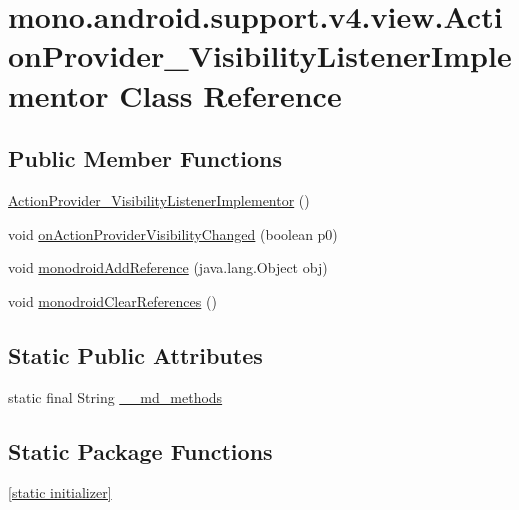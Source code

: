 \hypertarget{classmono_1_1android_1_1support_1_1v4_1_1view_1_1_action_provider___visibility_listener_implementor}{
\section{mono.android.support.v4.view.ActionProvider\_\-VisibilityListenerImplementor Class Reference}
\label{classmono_1_1android_1_1support_1_1v4_1_1view_1_1_action_provider___visibility_listener_implementor}
}
\subsection*{Public Member Functions}
\begin{CompactItemize}
\item 
\hyperlink{classmono_1_1android_1_1support_1_1v4_1_1view_1_1_action_provider___visibility_listener_implementor_54c95cb9758679e3b2254d2e794225ec}{ActionProvider\_\-VisibilityListenerImplementor} ()
\item 
void \hyperlink{classmono_1_1android_1_1support_1_1v4_1_1view_1_1_action_provider___visibility_listener_implementor_242f9c61e064dd7019178ff6eb12b360}{onActionProviderVisibilityChanged} (boolean p0)
\item 
void \hyperlink{classmono_1_1android_1_1support_1_1v4_1_1view_1_1_action_provider___visibility_listener_implementor_a32d9154545fa29cbb80371b3c21e709}{monodroidAddReference} (java.lang.Object obj)
\item 
void \hyperlink{classmono_1_1android_1_1support_1_1v4_1_1view_1_1_action_provider___visibility_listener_implementor_b013ec17b3d4bb666c53f6acfc93b9c4}{monodroidClearReferences} ()
\end{CompactItemize}
\subsection*{Static Public Attributes}
\begin{CompactItemize}
\item 
static final String \hyperlink{classmono_1_1android_1_1support_1_1v4_1_1view_1_1_action_provider___visibility_listener_implementor_fe06803b18ae0e7f0a030aee26e1ad1d}{\_\-\_\-md\_\-methods}
\end{CompactItemize}
\subsection*{Static Package Functions}
\begin{CompactItemize}
\item 
\hyperlink{classmono_1_1android_1_1support_1_1v4_1_1view_1_1_action_provider___visibility_listener_implementor_911e1803ab44db867bc2d7538233f9ec}{\mbox{[}static initializer\mbox{]}}
\end{CompactItemize}
